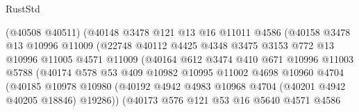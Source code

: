 \begin{lexlean}{RustStd}
\begin{coremodule}
                            (@40508 @40511)
                            (@40148
                              @3478
                              @121
                              @13
                              @16
                              @11011
                              @4586
                              (@40158
                                @3478
                                @13
                                @10996
                                @11009
                                (@22748
                                  @40112
                                  @4425
                                  @4348
                                  @3475
                                  @3153
                                  @772
                                  @13
                                  @10996
                                  @11005
                                  @4571
                                  @11009
                                  (@40164
                                    @612
                                    @3474
                                    @410
                                    @671
                                    @10996
                                    @11003
                                    @5788
                                    (@40174
                                      @578
                                      @53
                                      @409
                                      @10982
                                      @10995
                                      @11002
                                      @4698
                                      @10960
                                      @4704
                                      (@40185
                                        @10978
                                        @10980
                                        (@40192
                                          @4942
                                          @4983
                                          @10968
                                          @4704
                                          (@40201 @4942 @40205 @18846)
                                          @19286))
                                      (@40173
                                        @576
                                        @121
                                        @53
                                        @16
                                        @5640
                                        @4571
                                        @4586

\end{coremodule}
\end{lexlean}
